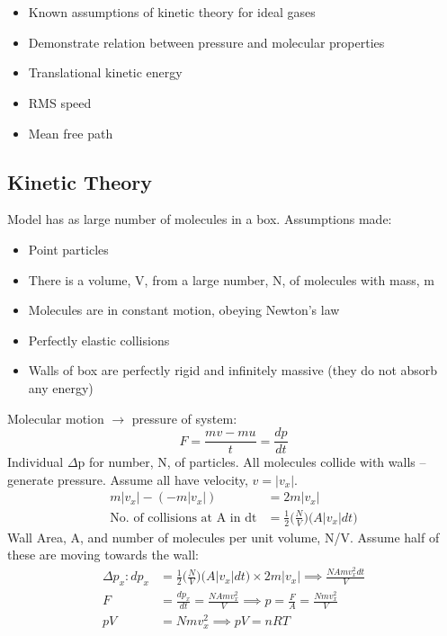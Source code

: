 \documentclass[a4paper, 11pt, normalem]{report}
\begin{document}
\chapter{}
\begin{itemize}
	\item Known assumptions of kinetic theory for ideal gases
	\item Demonstrate relation between pressure and molecular properties
	\item Translational kinetic energy
	\item RMS speed
	\item Mean free path
\end{itemize}

\section{Kinetic Theory}
Model has as large number of molecules in a box.
Assumptions made:
\begin{itemize}
	\item Point particles
	\item There is a volume, V, from a large number, N, of molecules with mass, m
	\item Molecules are in constant motion, obeying Newton's law
	\item Perfectly elastic collisions
	\item Walls of box are perfectly rigid and infinitely massive (they do not absorb any energy)
\end{itemize}
Molecular motion $\rightarrow$ pressure of system:
\begin{equation}
	F = \frac{mv-mu}{t} = \frac{dp}{dt}
\end{equation}
Individual $\Delta$p for number, N, of particles.
All molecules collide with walls -- generate pressure.
Assume all have velocity, $v = |v_{x}|$.
\begin{align}
    m|v_{x}| - (-m|v_{x}|) &= 2m|v_{x}| \\
    \text{No. of collisions at A in dt} &= \frac{1}{2}\Big(\frac{N}{V}\Big)\big(A|v_{x}|dt\big)
\end{align}
Wall Area, A, and number of molecules per unit volume, N/V.
Assume half of these are moving towards the wall:
\begin{align}
    {\Delta}p_{x}: dp_{x} &= \frac{1}{2}\Big(\frac{N}{V}\Big)\big(A|v_{x}|dt\big) \times 2m|v_{x}| \implies \frac{NAmv^{2}_{x}dt}{V} \\
    F &= \frac{dp_{x}}{dt} = \frac{NAmv^{2}_{x}}{V} \implies p = \frac{F}{A} = \frac{Nmv^{2}_{x}}{V} \\
    pV &= Nmv^{2}_{x} \implies pV = nRT
\end{align}
\end{document}

